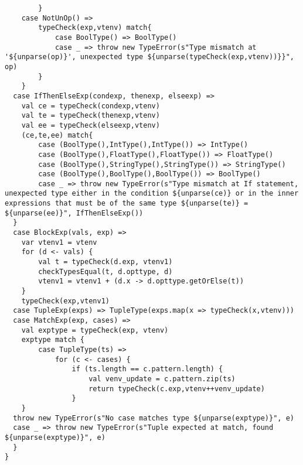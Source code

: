 \documentclass[a4paper, 10pt]{article}
\begin{document}
\begin{lstlisting}
  		}
  	case NotUnOp() =>
  		typeCheck(exp,vtenv) match{
  			case BoolType() => BoolType()
			case _ => throw new TypeError(s"Type mismatch at '${unparse(op)}', unexpected type ${unparse(typeCheck(exp,vtenv))}}", op)
  		}
  	}
  case IfThenElseExp(condexp, thenexp, elseexp) =>
  	val ce = typeCheck(condexp,vtenv)
  	val te = typeCheck(thenexp,vtenv)
  	val ee = typeCheck(elseexp,vtenv)
  	(ce,te,ee) match{
  		case (BoolType(),IntType(),IntType()) => IntType()
  		case (BoolType(),FloatType(),FloatType()) => FloatType()
  		case (BoolType(),StringType(),StringType()) => StringType()
  		case (BoolType(),BoolType(),BoolType()) => BoolType()
  		case _ => throw new TypeError(s"Type mismatch at If statement, unexpected type either in the condition ${unparse(ce)} or in the inner expressions that must be of the same type ${unparse(te)} = ${unparse(ee)}", IfThenElseExp())
  }
  case BlockExp(vals, exp) =>
  	var vtenv1 = vtenv
 	for (d <- vals) {
  		val t = typeCheck(d.exp, vtenv1)
  		checkTypesEqual(t, d.opttype, d)
  		vtenv1 = vtenv1 + (d.x -> d.opttype.getOrElse(t))
  	}
  	typeCheck(exp,vtenv1)
  case TupleExp(exps) => TupleType(exps.map(x => typeCheck(x,vtenv)))
  case MatchExp(exp, cases) =>
  	val exptype = typeCheck(exp, vtenv)
  	exptype match {
  		case TupleType(ts) =>
 			for (c <- cases) {
  				if (ts.length == c.pattern.length) {
  					val venv_update = c.pattern.zip(ts)
  					return typeCheck(c.exp,vtenv++venv_update)
  				}
  	}
  throw new TypeError(s"No case matches type ${unparse(exptype)}", e)
  case _ => throw new TypeError(s"Tuple expected at match, found ${unparse(exptype)}", e)
  }
}
\end{lstlisting}
\end{document}
